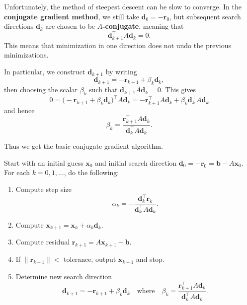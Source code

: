 \documentclass[
  letterpaper,
  DIV=11,
  numbers=noendperiod]{scrreprt}
\newenvironment{fbxSimple}[3]{\begin{tcolorbox}[enhanced, breakable,%
attach boxed title to top*={xshift=1.4pt},
boxed title style={boxrule=0.0mm, fuzzy shadow={1pt}{-1pt}{0mm}{0.1mm}{gray}, arc=.3em, rounded corners=east, sharp corners=west}, colframe=#1-color2, colbacktitle=#1-color1, colback = white, coltitle=black,  titlerule=0mm, toprule=0pt, bottomrule=.7pt, leftrule=.3em, rightrule=.7pt, outer arc=.3em,  	left=.5em, right=.5em, bottomtitle=1mm, toptitle=1mm,title=\textbf{#2}\hspace{0.5em}{#3}]}
{\end{tcolorbox}}
\begin{document}
Unfortunately, the method of steepest descent can be slow to converge.
In the \textbf{conjugate gradient method}, we still take
\(\mathbf{d}_0=-\mathbf{r}_0\), but subsequent search directions
\(\mathbf{d}_k\) are chosen to be \textbf{\(A\)-conjugate}, meaning that
\[
\mathbf{d}_{k+1}^\top A \mathbf{d}_k = 0.
\] This means that minimization in one direction does not undo the
previous minimizations.

In particular, we construct \(\mathbf{d}_{k+1}\) by writing \[
\mathbf{d}_{k+1} = -\mathbf{r}_{k+1} + \beta_k\mathbf{d}_k,
\] then choosing the scalar \(\beta_k\) such that
\(\mathbf{d}_{k+1}^\top A\mathbf{d}_k = 0\). This gives \[
0 = \big(-\mathbf{r}_{k+1} + \beta_k\mathbf{d}_k\big)^\top A \mathbf{d}_{k} = -\mathbf{r}_{k+1}^\top A \mathbf{d}_k + \beta_k\mathbf{d}_k^\top A \mathbf{d}_k
\] and hence \[
\beta_k = \frac{\mathbf{r}_{k+1}^\top A\mathbf{d}_k}{\mathbf{d}_k^\top A \mathbf{d}_k}.
\]

Thus we get the basic conjugate gradient algorithm.

\label{algorithm-3.2}
\begin{fbxSimple}{algorithm}{Algorithm 3.2: }{Conjugate gradient method}
\label{algorithm-3.2}

Start with an initial guess \(\mathbf{x}_0\) and initial search
direction \(\mathbf{d}_0 = -\mathbf{r}_0 = \mathbf{b} - A\mathbf{x}_0\).
For each \(k=0,1,\ldots\), do the following:

\begin{enumerate}
\def\labelenumi{\arabic{enumi}.}
\item
  Compute step size \[
  \alpha_k = -\frac{\mathbf{d}_k^\top\mathbf{r}_k}{\mathbf{d}_k^\top A \mathbf{d}_k}.
  \]
\item
  Compute \(\mathbf{x}_{k+1} = \mathbf{x}_k + \alpha_k\mathbf{d}_k\).
\item
  Compute residual
  \(\mathbf{r}_{k+1} = A\mathbf{x}_{k+1} - \mathbf{b}\).
\item
  If \(\|\mathbf{r}_{k+1}\| <\) tolerance, output \(\mathbf{x}_{k+1}\)
  and stop.
\item
  Determine new search direction \[
  \mathbf{d}_{k+1} = -\mathbf{r}_{k+1} + \beta_k\mathbf{d}_k \quad \textrm{where} \quad\beta_k = \frac{\mathbf{r}_{k+1}^\top A \mathbf{d}_k}{\mathbf{d}_k^\top A \mathbf{d}_k}.
  \]
\end{enumerate}

\end{fbxSimple}
\end{document}
